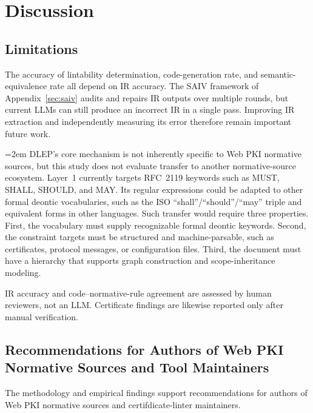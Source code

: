 \section{Discussion}
\label{sec:discussion}

\subsection{Limitations}
\label{subsec:limitations}

The accuracy of lintability determination, code-generation rate, and semantic-equivalence
rate all depend on IR accuracy. The SAIV framework of Appendix~\ref{sec:saiv} audits and repairs IR outputs over multiple
rounds, but current LLMs can still produce an incorrect IR in a single pass.
Improving IR extraction and independently measuring its error therefore remain
important future work.

\begingroup\emergencystretch=2em\relax
DLEP's core mechanism is not inherently specific to Web PKI normative sources, but this
study does not evaluate transfer to another normative-source ecosystem. Layer~1
currently targets RFC~2119 keywords such as MUST, SHALL, SHOULD, and MAY. Its
regular expressions could be adapted to other formal deontic vocabularies, such
as the ISO ``shall''/``should''/``may'' triple and equivalent forms in other
languages. Such transfer would require three properties. First, the vocabulary
must supply recognizable formal deontic keywords. Second, the constraint targets
must be structured and machine-parsable, such as certificates, protocol
messages, or configuration files. Third, the document must have a
hierarchy that supports graph construction and scope-inheritance modeling.
\par\endgroup


IR accuracy and code--normative-rule agreement are assessed by human reviewers,
not an LLM. Certificate findings are likewise reported only after manual
verification.

\subsection{Recommendations for Authors of Web PKI Normative Sources and Tool Maintainers}
\label{subsec:recommendations}

The methodology and empirical findings support recommendations for authors of Web PKI
normative sources and certifdicate-linter maintainers.

